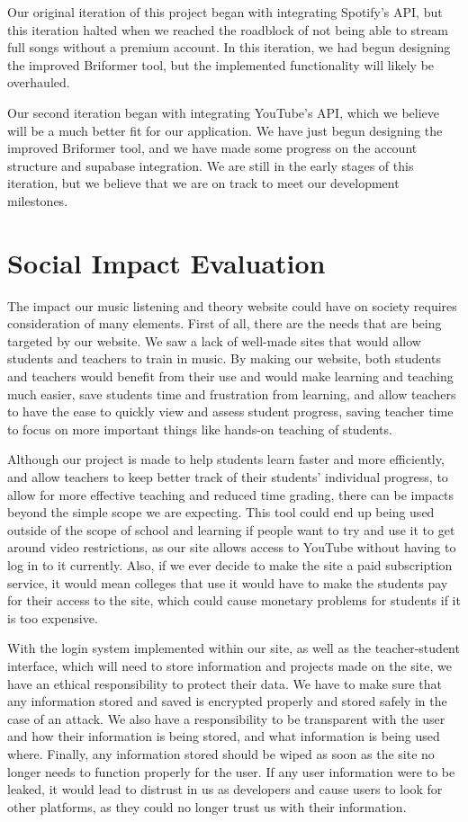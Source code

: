 \documentclass[12pt, letterpaper]{article}
\begin{document}
Our original iteration of this project began with integrating Spotify's API, but this iteration halted when we reached the roadblock of not being able to stream full songs without a premium account.  In this iteration, we had begun designing the improved Briformer tool, but the implemented functionality will likely be overhauled.

Our second iteration began with integrating YouTube's API, which we believe will be a much better fit for our application.  We have just begun designing the improved Briformer tool, and we have made some progress on the account structure and supabase integration.  We are still in the early stages of this iteration, but we believe that we are on track to meet our development milestones.

\section*{Social Impact Evaluation}
The impact our music listening and theory website could have on society requires consideration of many elements. First of all, there are the needs that are being targeted by our website. We saw a lack of well-made sites that would allow students and teachers to train in music. By making our website, both students and teachers would benefit from their use and would make learning and teaching much easier, save students time and frustration from learning, and allow teachers to have the ease to quickly view and assess student progress, saving teacher time to focus on more important things like hands-on teaching of students.

Although our project is made to help students learn faster and more efficiently, and allow teachers to keep better track of their students' individual progress, to allow for more effective teaching and reduced time grading, there can be impacts beyond the simple scope we are expecting. This tool could end up being used outside of the scope of school and learning if people want to try and use it to get around video restrictions, as our site allows access to YouTube without having to log in to it currently. Also, if we ever decide to make the site a paid subscription service, it would mean colleges that use it would have to make the students pay for their access to the site, which could cause monetary problems for students if it is too expensive.

With the login system implemented within our site, as well as the teacher-student interface, which will need to store information and projects made on the site, we have an ethical responsibility to protect their data. We have to make sure that any information stored and saved is encrypted properly and stored safely in the case of an attack. We also have a responsibility to be transparent with the user and how their information is being stored, and what information is being used where. Finally, any information stored should be wiped as soon as the site no longer needs to function properly for the user. If any user information were to be leaked, it would lead to distrust in us as developers and cause users to look for other platforms, as they could no longer trust us with their information.
\end{document}
